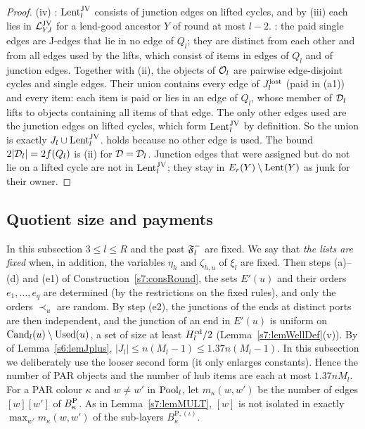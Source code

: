 \begin{proof}
(iv) : $\mathrm{Lent}^{\mathrm{JV}}_l$ consists of junction edges on lifted cycles, and by
(iii) each lies in $\mathcal{L}^{\mathrm{JV}}_{Y,l}$ for a lend-good ancestor $Y$ of round at most
$l-2$. : the paid single edges are J-edges that lie in no edge of $Q_l$;
they are distinct from each other and from all edges used by the lifts, which
consist of items in edges of $Q_l$ and of junction edges. Together with (ii), the
objects of $\mathcal{O}_l$ are pairwise edge-disjoint cycles and single edges. Their
union contains every edge of $J^{\mathrm{lost}}_l$ (paid in (a1)) and every item: each item
is paid or lies in an edge of $Q_l$, whose member of $\mathcal{D}_l$ lifts to objects
containing all items of that edge. The only other edges used are the junction
edges on lifted cycles, which form $\mathrm{Lent}^{\mathrm{JV}}_l$ by definition. So the union is
exactly $J_l\cup\mathrm{Lent}^{\mathrm{JV}}_l$.  holds because no other edge is used. The
bound $2|\mathcal{D}_l|=2f(Q_l)$ is (ii) for $\mathcal{D}=\mathcal{D}_l$. Junction edges that were
assigned but do not lie on a lifted cycle are not in $\mathrm{Lent}^{\mathrm{JV}}_l$; they stay in
$E_r(Y)\setminus\mathrm{Lent}(Y)$ as junk for their owner.
\end{proof}

\subsection{Quotient size and payments}

In this subsection $3\le l\le R$ and the past $\mathfrak{F}^{-}_l$ are fixed. We say that
\emph{the lists are fixed} when, in addition, the variables $\eta_h$ and
$\zeta_{h,u}$ of $\xi_l$ are fixed. Then steps (a)--(d) and (e1) of
Construction~\ref{s7:consRound}, the sets $E'(u)$ and their orders
$e_1,\dots,e_q$ are determined (by the restrictions on the fixed rules), and
only the orders $\prec_u$ are random. By step (e2), the junctions of the ends at distinct ports are then
independent, and the junction of an end in $E'(u)$ is uniform on
$\mathrm{Cand}_l(u)\setminus\mathrm{Used}(u)$, a set of size at least $H^{\mathrm{cd}}_l/2$
(Lemma~\ref{s7:lemWellDef}(v)). By  of Lemma~\ref{s6:lemJplus},
$|J_l|\le n(M_l-1)\le1.37n(M_l-1)$. In this subsection we deliberately use the
looser second form (it only enlarges constants). Hence the number of PAR
objects and the number of hub items are each at most $1.37nM_l$. For a PAR colour $\kappa$ and $w\ne w'$ in
$\mathrm{Pool}_l$, let $m_\kappa(w,w')$ be the number of edges $[w][w']$ of $B^{\mathrm{P}}_\kappa$.
As in Lemma~\ref{s7:lemMULT}, $[w]$ is not isolated in exactly
$\max_{w'}m_\kappa(w,w')$ of the sub-layers $B^{\mathrm{P},(\iota)}_\kappa$.

